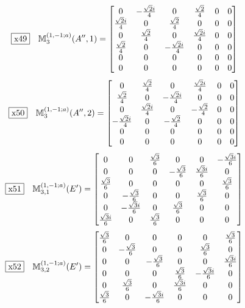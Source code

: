 \documentclass[fleqn,10pt,landscape]{jsarticle}
\begin{document}
\begin{dmath*}
\fbox{x49}\quad \mathbb{M}_{3}^{(1,-1;a)}(A^{\prime\prime},1)=\begin{bmatrix} 0 & - \frac{\sqrt{2} i}{4} & 0 & \frac{\sqrt{2}}{4} & 0 & 0 \\ \frac{\sqrt{2} i}{4} & 0 & \frac{\sqrt{2}}{4} & 0 & 0 & 0 \\ 0 & \frac{\sqrt{2}}{4} & 0 & \frac{\sqrt{2} i}{4} & 0 & 0 \\ \frac{\sqrt{2}}{4} & 0 & - \frac{\sqrt{2} i}{4} & 0 & 0 & 0 \\ 0 & 0 & 0 & 0 & 0 & 0 \\ 0 & 0 & 0 & 0 & 0 & 0 \end{bmatrix}
\end{dmath*}
\begin{dmath*}
\fbox{x50}\quad \mathbb{M}_{3}^{(1,-1;a)}(A^{\prime\prime},2)=\begin{bmatrix} 0 & \frac{\sqrt{2}}{4} & 0 & \frac{\sqrt{2} i}{4} & 0 & 0 \\ \frac{\sqrt{2}}{4} & 0 & - \frac{\sqrt{2} i}{4} & 0 & 0 & 0 \\ 0 & \frac{\sqrt{2} i}{4} & 0 & - \frac{\sqrt{2}}{4} & 0 & 0 \\ - \frac{\sqrt{2} i}{4} & 0 & - \frac{\sqrt{2}}{4} & 0 & 0 & 0 \\ 0 & 0 & 0 & 0 & 0 & 0 \\ 0 & 0 & 0 & 0 & 0 & 0 \end{bmatrix}
\end{dmath*}
\begin{dmath*}
\fbox{x51}\quad \mathbb{M}_{3,1}^{(1,-1;a)}(E^{\prime})=\begin{bmatrix} 0 & 0 & \frac{\sqrt{3}}{6} & 0 & 0 & - \frac{\sqrt{3} i}{6} \\ 0 & 0 & 0 & - \frac{\sqrt{3}}{6} & \frac{\sqrt{3} i}{6} & 0 \\ \frac{\sqrt{3}}{6} & 0 & 0 & 0 & 0 & \frac{\sqrt{3}}{6} \\ 0 & - \frac{\sqrt{3}}{6} & 0 & 0 & \frac{\sqrt{3}}{6} & 0 \\ 0 & - \frac{\sqrt{3} i}{6} & 0 & \frac{\sqrt{3}}{6} & 0 & 0 \\ \frac{\sqrt{3} i}{6} & 0 & \frac{\sqrt{3}}{6} & 0 & 0 & 0 \end{bmatrix}
\end{dmath*}
\begin{dmath*}
\fbox{x52}\quad \mathbb{M}_{3,2}^{(1,-1;a)}(E^{\prime})=\begin{bmatrix} \frac{\sqrt{3}}{6} & 0 & 0 & 0 & 0 & \frac{\sqrt{3}}{6} \\ 0 & - \frac{\sqrt{3}}{6} & 0 & 0 & \frac{\sqrt{3}}{6} & 0 \\ 0 & 0 & - \frac{\sqrt{3}}{6} & 0 & 0 & \frac{\sqrt{3} i}{6} \\ 0 & 0 & 0 & \frac{\sqrt{3}}{6} & - \frac{\sqrt{3} i}{6} & 0 \\ 0 & \frac{\sqrt{3}}{6} & 0 & \frac{\sqrt{3} i}{6} & 0 & 0 \\ \frac{\sqrt{3}}{6} & 0 & - \frac{\sqrt{3} i}{6} & 0 & 0 & 0 \end{bmatrix}
\end{dmath*}
\end{document}
